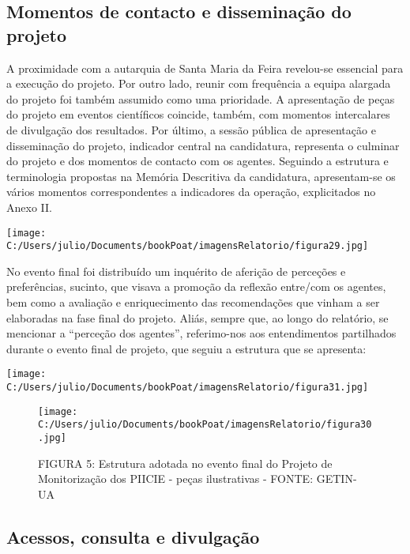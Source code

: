 \documentclass[
]{book}
\begin{document}
\hypertarget{momentos-de-contacto-e-disseminauxe7uxe3o-do-projeto}{%
\subsection{\texorpdfstring{\textbf{Momentos de contacto e disseminação do projeto}}{Momentos de contacto e disseminação do projeto}}\label{momentos-de-contacto-e-disseminauxe7uxe3o-do-projeto}}

A proximidade com a autarquia de Santa Maria da Feira revelou-se essencial para a execução do projeto. Por outro lado, reunir com frequência a equipa alargada do projeto foi também assumido como uma prioridade. A apresentação de peças do projeto em eventos científicos coincide, também, com momentos intercalares de divulgação dos resultados. Por último, a sessão pública de apresentação e disseminação do projeto, indicador central na candidatura, representa o culminar do projeto e dos momentos de contacto com os agentes. Seguindo a estrutura e terminologia propostas na Memória Descritiva da candidatura, apresentam-se os vários momentos correspondentes a indicadores da operação, explicitados no Anexo II.

\texttt{[image: C:/Users/julio/Documents/bookPoat/imagensRelatorio/figura29.jpg]}

No evento final foi distribuído um inquérito de aferição de perceções e preferências, sucinto, que visava a promoção da reflexão entre/com os agentes, bem como a avaliação e enriquecimento das recomendações que vinham a ser elaboradas na fase final do projeto. Aliás, sempre que, ao longo do relatório, se mencionar a ``perceção dos agentes'', referimo-nos aos entendimentos partilhados durante o evento final de projeto, que seguiu a estrutura que se apresenta:

\texttt{[image: C:/Users/julio/Documents/bookPoat/imagensRelatorio/figura31.jpg]}

\begin{figure}
\centering
\texttt{[image: C:/Users/julio/Documents/bookPoat/imagensRelatorio/figura30.jpg]}
\caption{FIGURA 5: Estrutura adotada no evento final do Projeto de Monitorização dos PIICIE - peças ilustrativas - FONTE: GETIN-UA}
\end{figure}

\hypertarget{acessos-consulta-e-divulgauxe7uxe3o}{%
\subsection{\texorpdfstring{\textbf{Acessos, consulta e divulgação}}{Acessos, consulta e divulgação}}\label{acessos-consulta-e-divulgauxe7uxe3o}}
\end{document}
